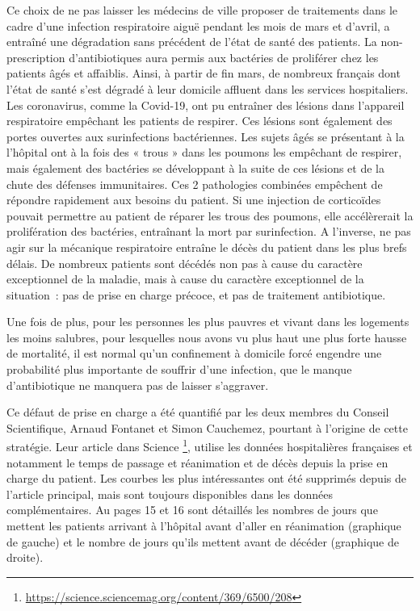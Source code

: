 \documentclass[
]{article}
\begin{document}
Ce choix de ne pas laisser les médecins de ville proposer de traitements
dans le cadre d'une infection respiratoire aiguë pendant les mois de
mars et d'avril, a entraîné une dégradation sans précédent de l'état de
santé des patients. La non-prescription d'antibiotiques aura permis aux
bactéries de proliférer chez les patients âgés et affaiblis. Ainsi, à
partir de fin mars, de nombreux français dont l'état de santé s'est
dégradé à leur domicile affluent dans les services hospitaliers. Les
coronavirus, comme la Covid-19, ont pu entraîner des lésions dans
l'appareil respiratoire empêchant les patients de respirer. Ces lésions
sont également des portes ouvertes aux surinfections bactériennes. Les
sujets âgés se présentant à la l'hôpital ont à la fois des « trous »
dans les poumons les empêchant de respirer, mais également des bactéries
se développant à la suite de ces lésions et de la chute des défenses
immunitaires. Ces 2 pathologies combinées empêchent de répondre
rapidement aux besoins du patient. Si une injection de corticoïdes
pouvait permettre au patient de réparer les trous des poumons, elle
accélèrerait la prolifération des bactéries, entraînant la mort par
surinfection. A l'inverse, ne pas agir sur la mécanique respiratoire
entraîne le décès du patient dans les plus brefs délais. De nombreux
patients sont décédés non pas à cause du caractère exceptionnel de la
maladie, mais à cause du caractère exceptionnel de la situation~: pas de
prise en charge précoce, et pas de traitement antibiotique.

Une fois de plus, pour les personnes les plus pauvres et vivant dans les
logements les moins salubres, pour lesquelles nous avons vu plus haut
une plus forte hausse de mortalité, il est normal qu'un confinement à
domicile forcé engendre une probabilité plus importante de souffrir
d'une infection, que le manque d'antibiotique ne manquera pas de laisser
s'aggraver.

Ce défaut de prise en charge a été quantifié par les deux membres du
Conseil Scientifique, Arnaud Fontanet et Simon Cauchemez, pourtant à
l'origine de cette stratégie. Leur article dans Science \footnote{\url{https://science.sciencemag.org/content/369/6500/208}},
utilise les données hospitalières françaises et notamment le temps de
passage et réanimation et de décès depuis la prise en charge du patient.
Les courbes les plus intéressantes ont été supprimés depuis de l'article
principal, mais sont toujours disponibles dans les données
complémentaires. Au pages 15 et 16 sont détaillés les nombres de jours
que mettent les patients arrivant à l'hôpital avant d'aller en
réanimation (graphique de gauche) et le nombre de jours qu'ils mettent
avant de décéder (graphique de droite).
\end{document}
